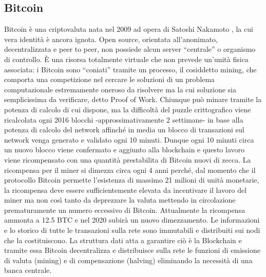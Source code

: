 \subsection{Bitcoin}
Bitcoin è una criptovaluta nata nel 2009 ad opera di Satoshi Nakamoto \cite{bitcoinpaper}, la cui vera identità è ancora ignota. Open source, orientata all’anonimato, decentralizzata e peer to peer, non possiede alcun server “centrale” o organismo di controllo. È una risorsa totalmente virtuale che non prevede un’unità fisica associata: i Bitcoin sono “coniati” tramite un processo, il cosiddetto mining, che comporta una competizione nel cercare le soluzioni di un problema computazionale estremamente oneroso da risolvere ma la cui soluzione sia semplicissima da verificare, detto Proof of Work.
Chiunque può minare tramite la potenza di calcolo di cui dispone, ma la difficoltà del puzzle crittografico viene ricalcolata ogni 2016 blocchi -approssimativamente 2 settimane- in base alla potenza di calcolo del network affinché in media un blocco di transazioni sul network venga generato e validato ogni 10 minuti. Dunque ogni 10 minuti circa un nuovo blocco viene confermato e aggiunto alla blockchain e questo lavoro viene ricompensato con una quantità prestabilita di Bitcoin nuovi di zecca. 
La ricompensa per il miner si dimezza circa ogni 4 anni perché, dal momento che il protocollo Bitcoin permette l’esistenza di massimo 21 milioni di unità monetarie, la ricompensa deve essere sufficientemente elevata da incentivare il lavoro del miner ma non così tanto da deprezzare la valuta mettendo in circolazione prematuramente un numero eccessivo di Bitcoin. Attualmente la ricompensa ammonta a 12.5 BTC e nel 2020 subirà un nuovo dimezzamento.\cite{blockonomi}
Le informazioni e lo storico di tutte le transazioni sulla rete sono immutabili e distribuiti sui nodi che la costituiscono. La struttura dati atta a garantire ciò è la Blockchain e tramite essa Bitcoin decentralizza e distribuisce sulla rete le funzioni di emissione di valuta (mining) e di compensazione (halving) eliminando la necessità di una banca centrale.



